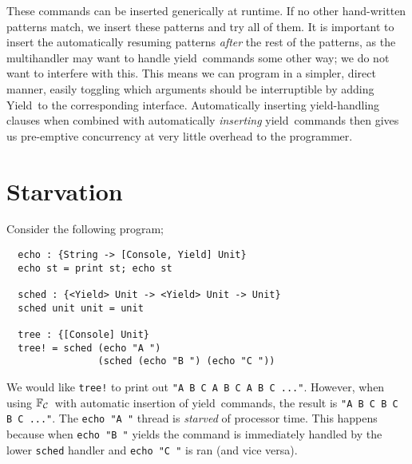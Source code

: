 \documentclass[msc,deptreport,cs]{infthesis} %
\newcommand{\code}[1]{\lstinline{#1}}
\newcommand\countingfrank{$\mathbb{F}_{\cal{C}}$}
\newcommand\yield{\textsf{yield}\xspace}
\newcommand\Yield{\textsf{Yield}\xspace}
\begin{document}



These commands can be inserted generically at runtime. If no other hand-written
patterns match, we insert these patterns and try all of them. It is important to
insert the automatically resuming patterns \emph{after} the rest of the
patterns, as the multihandler may want to handle \yield~commands some other way;
we do not want to interfere with this. This means we can program in a simpler,
direct manner, easily toggling which arguments should be interruptible by adding
\Yield~to the corresponding interface. Automatically inserting \yield-handling
clauses when combined with automatically \emph{inserting} \yield~commands then
gives us pre-emptive concurrency at very little overhead to the programmer.

\section{Starvation}
\label{sec:starvation}

Consider the following program;

\begin{lstlisting}
  echo : {String -> [Console, Yield] Unit}
  echo st = print st; echo st

  sched : {<Yield> Unit -> <Yield> Unit -> Unit}
  sched unit unit = unit

  tree : {[Console] Unit}
  tree! = sched (echo "A ")
                (sched (echo "B ") (echo "C "))
\end{lstlisting}

We would like \code{tree!} to print out \code{"A B C A B C A B C ..."}. However,
when using \countingfrank~with automatic insertion of \yield~commands, the
result is \code{"A B C B C B C ..."}. The \code{echo "A "} thread is
\emph{starved} of processor time. This happens because when \code{echo "B "}
yields the command is immediately handled by the lower \code{sched} handler and
\code{echo "C "} is ran (and vice versa).
\end{document}
